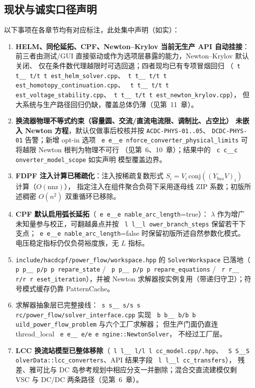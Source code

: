 \documentclass[UTF8,fontset=windows,a4paper,11pt]{ctexart}
\makeatletter
\newcommand{\fld}[1]{\texttt{\fld@scan#1\fld@stop}}
\def\fld@scan#1{%
  \ifx#1\fld@stop
  \else
    \ifx#1\_\_\allowbreak\else#1\fi
    \expandafter\fld@scan
  \fi}
\newcommand{\srcpath}[1]{\texttt{\src@scan#1\src@stop}}
\def\src@scan#1{%
  \ifx#1\src@stop
  \else
    \ifx#1\_\_\allowbreak\else
    \ifx#1/#1\allowbreak\else
    #1\fi\fi
    \expandafter\src@scan
  \fi}
\makeatother
\begin{document}
\subsection{现状与诚实口径声明}
以下事项在各章节均有对应标注，此处集中声明（如实）：
\begin{enumerate}
  \item \textbf{HELM、同伦延拓、CPF、Newton--Krylov 当前无生产 API 自动挂接}：
        前三者由测试/GUI 直接驱动或作为选项层暴露的能力，Newton--Krylov 默认关闭、
        仅在条件数代理越限时可选回退；四者现均已有专项冒烟回归
        （\srcpath{test\_helm\_solver.cpp}、\srcpath{test\_homotopy\_continuation.cpp}、
        \srcpath{test\_voltage\_stability.cpp}、\srcpath{test\_newton\_krylov.cpp}），
        但大系统与生产路径回归仍缺，覆盖总体仍薄（见第~11~章）。
  \item \textbf{换流器物理不等式约束（容量圆、交流/直流电流限、调制比、占空比）
        未嵌入 Newton 方程}，默认仅做事后校核并按 \texttt{ACDC-PHYS-01..05}、
        \texttt{DCDC-PHYS-01} 告警；新增 opt-in 选项
        \fld{enforce\_converter\_physical\_limits} 可将越限 Newton 根判为物理不可行
        （见第~6、10~章）；结果中的 \fld{converter\_model\_scope} 如实声明
        模型覆盖边界。
  \item \textbf{FDPF 注入计算已稀疏化}：注入按稀疏复数形式
        $S_i=V_i\,\mathrm{conj}((Y_{bus}V)_i)$ 计算（$O(\mathrm{nnz})$），
        指定注入在组件聚合负荷下采用逐母线 ZIP 系数；初版所述稠密 $O(n^2)$
        双重循环已移除。
  \item \textbf{CPF 默认启用弧长延拓}（\fld{enable\_arc\_length}=true）：
        $\lambda$ 作为增广未知量参与校正，可翻越鼻点并按
        \fld{lower\_branch\_steps} 保留若干下支点；\fld{enable\_arc\_length}=false
        时保留初版所述自然参数化模式。电压稳定指标仍仅负荷裕度族，无 $L$ 指标。
  \item \texttt{include/hacdcpf/power\_flow/workspace.hpp} 的
        \texttt{SolverWorkspace} 已落地（\srcpath{prepare\_state} /
        \srcpath{prepare\_equations} / \srcpath{reset\_iteration}），并被
        Newton 求解器按实例复用（带递归守卫）；符号模式缓存仍靠 PatternCache。
  \item 求解器抽象层已完整接线：\srcpath{src/power\_flow/solver\_interface.cpp}
        实现 \srcpath{build\_power\_flow\_problem} 与六个工厂求解器；
        但生产门面仍直连 thread\_local \srcpath{engine::NewtonSolver}，
        不经过工厂层。
  \item \textbf{LCC 换流站模型已整体移除}（\srcpath{lcc\_model.cpp/.hpp}、
        \fld{SolverData::lcc\_converters}、API 结果字段 \fld{lcc\_transfers}），
        残差、雅可比与 DC 岛参考规划中相应分支一并删除；混合交直流建模仅剩
        VSC 与 DC/DC 两条路径（见第~6~章）。
\end{enumerate}

\newpage











\end{document}
